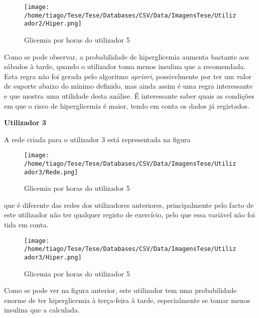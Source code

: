 \begin{figure}[H]
\centering
\texttt{[image: /home/tiago/Tese/Tese/Databases/CSV/Data/ImagensTese/Utilizador2/Hiper.png]}
\caption{Glicemia por horas do utilizador 5}
\end{figure}

Como se pode observar, a probabilidade de hiperglicemia aumenta bastante aos sábados à tarde, quando o utilizador toma menos insulina que a recomendada. Esta regra não foi gerada pelo algoritmo \textit{apriori}, possivelmente por ter um valor de suporte abaixo do mínimo definido, mas ainda assim é uma regra interessante e que mostra uma utilidade desta análise. É interessante saber quais as condições em que o risco de hiperglicemia é maior, tendo em conta os dados já registados. 

\textbf{Utilizador 3}

A rede criada para o utilizador 3 está representada na figura

\begin{figure}[H]
\centering
\texttt{[image: /home/tiago/Tese/Tese/Databases/CSV/Data/ImagensTese/Utilizador3/Rede.png]}
\caption{Glicemia por horas do utilizador 5}
\end{figure}

que é diferente das redes dos utilizadores anteriores, principalmente pelo facto de este utilizador não ter qualquer registo de exercício, pelo que essa variável não foi tida em conta.

\begin{figure}[H]
\centering
\texttt{[image: /home/tiago/Tese/Tese/Databases/CSV/Data/ImagensTese/Utilizador3/Hiper.png]}
\caption{Glicemia por horas do utilizador 5}
\end{figure}

Como se pode ver na figura anterior, este utilizador tem uma probabilidade enorme de ter hiperglicemia à terça-feira à tarde, especialmente se tomar menos insulina que a calculada. 